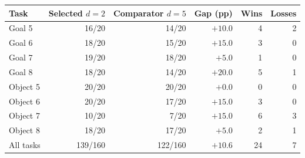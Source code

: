 \begin{tabular}{@{}lrrrrr@{}}
\toprule
Task & Selected $d=2$ & Comparator $d=5$ & Gap (pp) & Wins & Losses\\
\midrule
Goal 5 & 16/20 & 14/20 & $+10.0$ & 4 & 2\\
Goal 6 & 18/20 & 15/20 & $+15.0$ & 3 & 0\\
Goal 7 & 19/20 & 18/20 & $+5.0$ & 1 & 0\\
Goal 8 & 18/20 & 14/20 & $+20.0$ & 5 & 1\\
Object 5 & 20/20 & 20/20 & $+0.0$ & 0 & 0\\
Object 6 & 20/20 & 17/20 & $+15.0$ & 3 & 0\\
Object 7 & 10/20 & 7/20 & $+15.0$ & 6 & 3\\
Object 8 & 18/20 & 17/20 & $+5.0$ & 2 & 1\\
\midrule
All tasks & 139/160 & 122/160 & $+10.6$ & 24 & 7\\
\bottomrule
\end{tabular}
